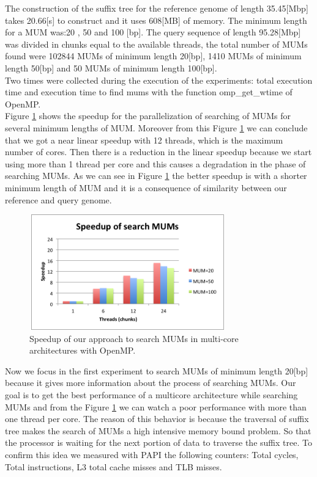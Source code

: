 \documentclass[3p,times]{elsarticle}
\begin{document}
The construction of the suffix tree for the reference genome of length 35.45[Mbp] takes 20.66[s] to construct and it uses 608[MB] of memory. The minimum length for a MUM was:20 , 50 and 100 [bp]. The query sequence of length 95.28[Mbp] was divided in chunks equal to the available threads, the total number of MUMs found were 102844 MUMs of minimum length 20[bp], 1410 MUMs of minimum length 50[bp] and 50 MUMs of minimum length 100[bp].\\
Two times were collected during the execution of the experiments: total execution time and execution time to find mums with the function omp\_get\_wtime of OpenMP.\\
Figure \ref{fig:speedup} shows the speedup for the parallelization of searching of MUMs for several minimum lengths of MUM. Moreover from this Figure \ref{fig:speedup} we can conclude that we got a near linear speedup with 12 threads, which is the maximum number of cores. Then there is a reduction in the linear speedup because we start using more than 1 thread per core and this causes a degradation in the phase of searching MUMs. As we can see in Figure \ref{fig:speedup} the better speedup is with a shorter minimum length of MUM and it is a consequence of similarity between our reference and query genome.\\
\begin{figure}[htb]
  \centering
  \includegraphics[width=8.5cm,height=5cm]{speedup.png}
  \caption{Speedup of our approach to search MUMs in multi-core architectures with OpenMP.}
  \label{fig:speedup}
 \end{figure}  
 Now we focus in the first experiment to search MUMs of minimum length 20[bp] because it gives more information about the process of searching MUMs. Our goal is to get the best performance of a multicore architecture while searching MUMs and from the Figure \ref{fig:speedup} we can watch a poor performance with more than one thread per core. The reason of this behavior is because the traversal of suffix tree makes the search of MUMs a high intensive memory bound problem. So that the processor is waiting for the next portion of data to traverse the suffix tree. To confirm this idea we measured with PAPI the following counters: Total cycles, Total instructions, L3 total cache misses and TLB misses.\\
\end{document}
